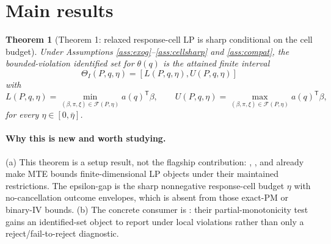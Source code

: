 \documentclass[11pt]{article}
\newcommand{\transpose}{\mathsf{T}}
\theoremstyle{definition}
\theoremstyle{plain}
\newtheorem{theorem}{Theorem}
\theoremstyle{remark}
\begin{document}
\section{Main results}
\begin{theorem}[Theorem 1: relaxed response-cell LP is sharp conditional on the cell budget]\label{thm:lp}
Under Assumptions \ref{ass:exog}--\ref{ass:cellsharp} and \ref{ass:compat}, the bounded-violation identified set for \(\theta(q)\) is the attained finite interval
\[
\Theta_I(P,q,\eta)=[L(P,q,\eta),U(P,q,\eta)]
\]
with
\[
L(P,q,\eta)=\min_{(\beta,\pi,\xi)\in\mathcal F(P,\eta)}a(q)^\transpose\beta,\qquad
U(P,q,\eta)=\max_{(\beta,\pi,\xi)\in\mathcal F(P,\eta)}a(q)^\transpose\beta,
\]
for every \(\eta\in[0,\bar\eta]\).
\end{theorem}
\paragraph{Why this is new and worth studying.}
(a) This theorem is a setup result, not the flagship contribution: \citet{MogstadSantosTorgovitsky2018}, \citet{MogstadTorgovitskyWalters2024}, and \citet{HanYang2024} already make MTE bounds finite-dimensional LP objects under their maintained restrictions.  The epsilon-gap is the sharp nonnegative response-cell budget \(\eta\) with no-cancellation outcome envelopes, which is absent from those exact-PM or binary-IV bounds.  (b) The concrete consumer is \citet{JiangSun2023}: their partial-monotonicity test gains an identified-set object to report under local violations rather than only a reject/fail-to-reject diagnostic.
\end{document}
